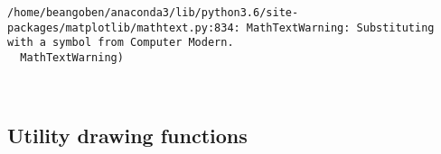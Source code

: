 \documentclass[11pt]{article}
\begin{document}
    \begin{Verbatim}[commandchars=\\\{\}]
/home/beangoben/anaconda3/lib/python3.6/site-packages/matplotlib/mathtext.py:834: MathTextWarning: Substituting with a symbol from Computer Modern.
  MathTextWarning)

    \end{Verbatim}

    \begin{center}
    \end{center}
    { \hspace*{\fill} \\}
    
    \subsection{Utility drawing functions}\label{utility-drawing-functions}
\end{document}
